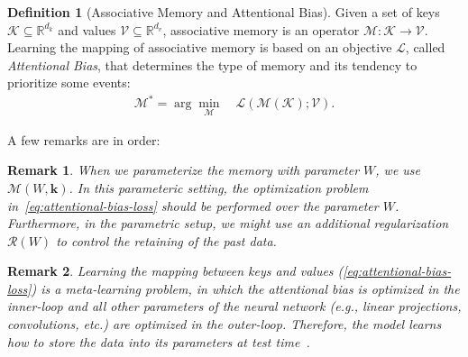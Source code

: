 \documentclass{article}
\newcommand{\citep}{\parencite}
\newcommand{\vk}[0]{\mathbf{k}}
\newcommand{\M}[0]{\mathcal{M}}
\newtheorem{remark}{Remark}
\theoremstyle{plain}
\theoremstyle{definition}
\newtheorem{definition}[theorem]{Definition}
\theoremstyle{remark}
\begin{document}
\begin{definition}[Associative Memory and Attentional Bias] \label{dfn:associative-memory}
Given a set of keys $\mathcal{K} \subseteq \mathbb{R}^{d_k}$ and values $\mathcal{V} \subseteq \mathbb{R}^{d_v}$, associative memory is an operator $\M: \mathcal{K} \rightarrow \mathcal{V}$. Learning the mapping of associative memory is based on an objective $\mathcal{L}$, called \emph{Attentional Bias}, that determines the type of memory and its tendency to prioritize some events:
\begin{align}\label{eq:attentional-bias-loss}
    \M^* = \arg\min_{\M}\quad \mathcal{L}(\M(\mathcal{K}); \mathcal{V}).
\end{align}
\end{definition}
A few remarks are in order:
\begin{remark}\label{remark:regularization}
 When we parameterize the memory with parameter $W$, we use $\M(W,\vk)$. In this parameteric setting,  the optimization problem in~\eqref{eq:attentional-bias-loss} should be performed over the parameter $W$. Furthermore, in the parametric setup, we might use an additional regularization $\mathcal{R}(W)$ to control the retaining of the past data.
\end{remark} 

\begin{remark}
Learning the mapping between keys and values (\autoref{eq:attentional-bias-loss}) is a meta-learning problem, in which the attentional bias is optimized in the inner-loop and all other parameters of the neural network (e.g., linear projections, convolutions, etc.) are optimized in the outer-loop. Therefore, the model learns how to store the data into its parameters at test time~\citep{sun2024learning, behrouz2024titans}.
\end{remark}
\end{document}
